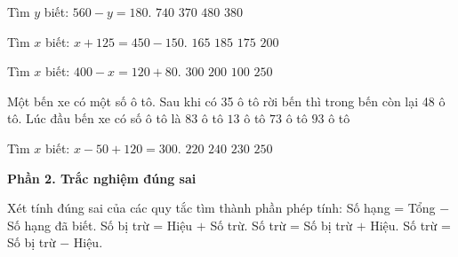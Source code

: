 \begin{ex} %
Tìm $y$ biết: $560 - y = 180$.
\choice
{$740$}
{$370$}
{$480$}
{\True $380$}
\end{ex}

\begin{ex} %
Tìm $x$ biết: $x + 125 = 450 - 150$.
\choice
{$165$}
{$185$}
{\True $175$}
{$200$}
\end{ex}

\begin{ex} %
Tìm $x$ biết: $400 - x = 120 + 80$.
\choice
{$300$}
{\True $200$}
{$100$}
{$250$}
\end{ex}

\begin{ex} %
Một bến xe có một số ô tô. Sau khi có 35 ô tô rời bến thì trong bến còn lại 48 ô tô. Lúc đầu bến xe có số ô tô là
\choice
{\True $83$ ô tô}
{$13$ ô tô}
{$73$ ô tô}
{$93$ ô tô}
\end{ex}

\begin{ex} %
Tìm $x$ biết: $x - 50 + 120 = 300$.
\choice
{$220$}
{$240$}
{\True $230$}
{$250$}
\end{ex}

\textbf{Phần 2. Trắc nghiệm đúng sai}

\begin{ex} %
Xét tính đúng sai của các quy tắc tìm thành phần phép tính:
\choiceTF
{\True Số hạng = Tổng $-$ Số hạng đã biết.}
{\True Số bị trừ = Hiệu $+$ Số trừ.}
{Số trừ = Số bị trừ $+$ Hiệu.}
{\True Số trừ = Số bị trừ $-$ Hiệu.}
\end{ex}

